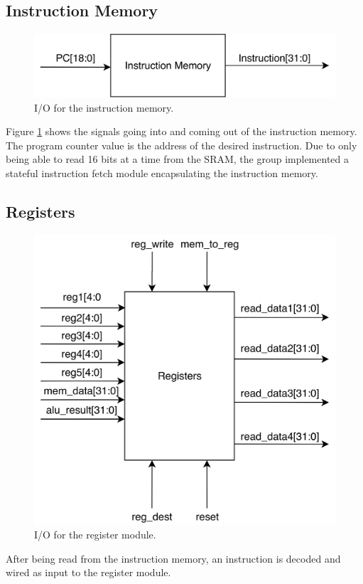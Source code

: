 \subsection{Instruction Memory}

\begin{figure}[h!]
    \centering
    \includegraphics[width=0.6\linewidth]{images/instruction-memory.png}
    \caption{I/O for the instruction memory.}
    \label{fig:instruction-memory}
\end{figure}

Figure \ref{fig:instruction-memory} shows the signals going into and coming out of the instruction memory.
The program counter value is the address of the desired instruction.
Due to only being able to read 16 bits at a time from the SRAM, the group implemented a stateful instruction fetch module encapsulating the instruction memory.

\subsection{Registers}

\begin{figure}[h!]
    \centering
    \includegraphics[width=0.6\linewidth]{images/registers.png}
    \caption{I/O for the register module.}
    \label{fig:registers}
\end{figure}

After being read from the instruction memory, an instruction is decoded and wired as input to the register module.

